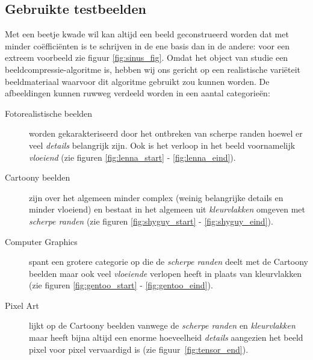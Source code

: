 \subsection{Gebruikte testbeelden}
\label{testjes}
Met een beetje kwade wil kan altijd een beeld geconstrueerd worden dat met minder co\"effici\"enten is te schrijven
in de ene basis dan in de andere: voor een extreem voorbeeld zie figuur \ref{fig:sinus_fig}.
Omdat het object van studie een beeldcompressie-algoritme is, hebben wij ons gericht op een realistische vari\"eteit
beeldmateriaal waarvoor dit algoritme gebruikt zou kunnen worden. 
De afbeeldingen kunnen ruwweg verdeeld worden in een aantal categorie\"en:
\begin{description}
\item[Fotorealistische beelden] worden gekarakteriseerd door het ontbreken van scherpe randen hoewel
  er veel \emph{details} belangrijk zijn. Ook is het verloop in het beeld voornamelijk \emph{vloeiend}
  (zie figuren \ref{fig:lenna_start} - \ref{fig:lenna_eind}).
\item[Cartoony beelden] zijn over het algemeen minder complex (weinig belangrijke details en minder vloeiend) 
  en bestaat in het algemeen uit \emph{kleurvlakken} omgeven met \emph{scherpe randen}
  (zie figuren \ref{fig:shyguy_start} - \ref{fig:shyguy_eind}).
\item [Computer Graphics] spant een grotere categorie op die de \emph{scherpe randen} deelt met de Cartoony beelden
  maar ook veel \emph{vloeiende} verlopen heeft in plaats van kleurvlakken
  (zie figuren \ref{fig:gentoo_start} - \ref{fig:gentoo_eind}).
\item[Pixel Art] lijkt op de Cartoony beelden vanwege de \emph{scherpe randen} en \emph{kleurvlakken}
  maar heeft bijna altijd een enorme hoeveelheid \emph{details} aangezien het beeld pixel voor pixel vervaardigd is (zie figuur~\ref{fig:tensor_end}).
\end{description}

